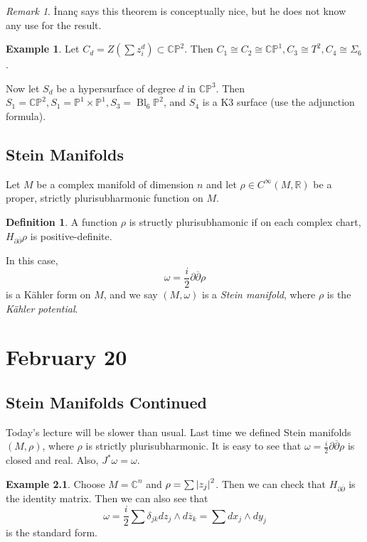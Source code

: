 \documentclass[leqno, openany]{memoir}
\theoremstyle{definition}
\newtheorem{defn}[thm]{Definition}
\newtheorem{exm}[thm]{Example}
\theoremstyle{remark}
\newtheorem{rmk}[thm]{Remark}
\theoremstyle{plain}
\theoremstyle{definition}
\theoremstyle{remark}
\newcommand{\R}{\mathbb{R}}
\newcommand{\C}{\mathbb{C}}
\renewcommand{\P}{\mathbb{P}}
\begin{document}
\begin{rmk}
    \.Inan\c{c} says this theorem is conceptually nice, but he does not know any use for the result.
\end{rmk}

\begin{exm}
    Let $C_d = Z \left( \sum z_i^d \right) \subset \C\P^2$. Then $C_1 \cong C_2 \cong \C\P^1, C_3 \cong T^2, C_4 \cong \Sigma_6$.

    Now let $S_d$ be a hypersurface of degree $d$ in $\C\P^3$. Then $S_1 = \C\P^2, S_1 = \P^1 \times \P^1, S_3 = \operatorname{Bl}_6 \P^2$, and $S_4$ is a K3 surface (use the adjunction formula).
\end{exm}

\section{Stein Manifolds}%
\label{sec:stein_manifolds}

Let $M$ be a complex manifold of dimension $n$ and let $\rho \in C^{\infty}(M, \R)$ be a proper, strictly plurisubharmonic function on $M$.

\begin{defn}
    A function $\rho$ is structly plurisubhamonic if on each complex chart, $H_{\partial \overline{\partial}} \rho$ is positive-definite.
\end{defn}
In this case, \[\omega = \frac{i}{2} \partial \overline{\partial} \rho \] is a K\"ahler form on $M$, and we say $(M, \omega)$ is a \textit{Stein manifold}, where $\rho$ is the \textit{K\"ahler potential}.

\chapter{February 20}%
\label{cha:february_20}

\section{Stein Manifolds Continued}%
\label{sec:stein_manifolds_continued}

Today's lecture will be slower than usual. Last time we defined Stein manifolds $(M, \rho)$, where $\rho$ is strictly plurisubharmonic. It is easy to see that $\omega = \frac{i}{2} \partial \overline{\partial} \rho$ is closed and real. Also, $J^*\omega = \omega$.

\begin{exm}
    Choose $M = \C^n$ and $\rho = \sum \abs{z_j}^2$. Then we can check that $H_{\partial \overline{\partial}}$ is the identity matrix. Then we can also see that 
    \[ \omega = \frac{i}{2} \sum \delta_{jk} dz_j \wedge d\overline{z}_k = \sum dx_j \wedge dy_j \]
    is the standard form.
\end{exm}
\end{document}
